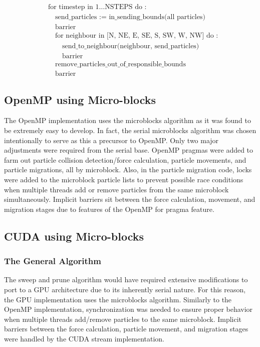 \documentclass[11pt]{article} %
\begin{document}
\[
\begin{aligned} & \text{for timestep in }1\ldots\text{NSTEPS do :}\\
 & \quad\text{send\_particles := in\_sending\_bounds(all particles)}\\
 & \quad\text{barrier}\\
 & \quad\text{for neighbour in [N, NE, E, SE, S, SW, W, NW] do :}\\
 & \quad\quad\text{send\_to\_neighbour(neighbour, send\_particles)}\\
 & \quad\quad\text{barrier}\\
 & \quad\text{remove\_particles\_out\_of\_responsible\_bounds}\\
 & \quad\text{barrier}
\end{aligned}
\]

\subsection{OpenMP using Micro-blocks}

The OpenMP implementation uses the microblocks algorithm as it was found to be extremely easy to develop. In fact, the serial microblocks algorithm was chosen intentionally to serve as this a precursor to OpenMP. Only two major adjustments were required from the serial base. OpenMP pragmas were added to farm out particle collision detection/force calculation, particle movements, and particle migrations, all by microblock. Also, in the particle migration code, locks were added to the microblock particle lists to prevent possible race conditions when multiple threads add or remove particles from the same microblock simultaneously. Implicit barriers sit between the force calculation, movement, and migration stages due to features of the OpenMP for pragma feature.

\subsection{CUDA using Micro-blocks}

\subsubsection{The General Algorithm}

The sweep and prune algorithm would have required extensive modifications to port to a GPU architecture due to its inherently serial nature. For this reason, the GPU implementation uses the microblocks algorithm. Similarly to the OpenMP implementation, synchronization was needed to ensure proper behavior when multiple threads add/remove particles to the same microblock. Implicit barriers between the force calculation, particle movement, and migration stages were handled by the CUDA stream implementation.
\end{document}
